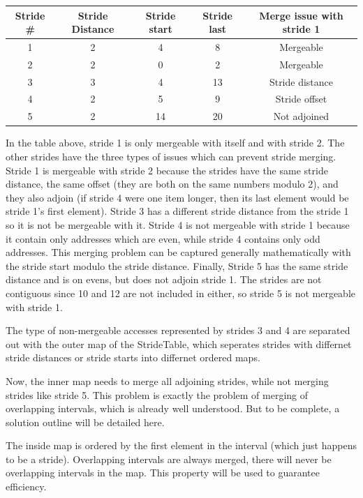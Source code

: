 \documentclass[12pt,twoside]{reedthesis}
\begin{document}
			\noindent
			\begin{tabular}{ |c||c|c|c|c| } 
				\hline
				Stride \# & Stride Distance & Stride start & Stride last & Merge issue with stride 1 \\ 
				\hline
				\hline
				1 & 2 & 4 & 8 & Mergeable \\ \hline
				2 & 2  & 0  & 2 & Mergeable \\ \hline
				3 & 3 & 4 & 13 & Stride distance \\ \hline
				4 & 2  & 5  & 9 & Stride offset \\ \hline
				5 & 2  & 14  & 20 & Not adjoined \\ 
				\hline
			\end{tabular}
		
			In the table above, stride 1 is only mergeable with itself and with stride 2. The other strides have the three types of issues which can prevent stride merging. Stride 1 is mergeable with stride 2 because the strides have the same stride distance, the same offset (they are both on the same numbers modulo 2), and they also adjoin (if stride 4 were one item longer, then its last element would be stride 1's first element). 
			Stride 3 has a different stride distance from the stride 1 so it is not be mergeable with it. Stride 4 is not mergeable with stride 1 because it contain only addresses which are even, while stride 4 contains only odd addresses. This merging problem can be captured generally mathematically with the stride start modulo the stride distance.
			Finally, Stride 5 has the same stride distance and is on evens, but does not adjoin stride 1. The strides are not contiguous since 10 and 12 are not included in either, so stride 5 is not mergeable with stride 1.
			
			The type of non-mergeable accesses represented by strides 3 and 4 are separated out with the outer map of the StrideTable, which seperates strides with differnet stride distances or stride starts into differnet ordered maps. 
			
			Now, the inner map needs to merge all adjoining strides, while not merging strides like stride 5. This problem is exactly the problem of merging of overlapping intervals, which is already well understood. But to be complete, a solution outline will be detailed here. %
			
			The inside map is ordered by the first element in the interval (which just happens to be a stride). Overlapping intervals are always merged, there will never be overlapping intervals in the map. This property will be used to guarantee efficiency.
			
\end{document}
